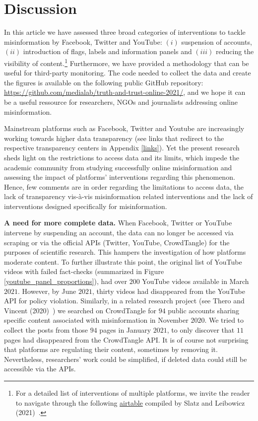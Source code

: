 \documentclass{article}
\begin{document}
\section{Discussion}

In this article we have assessed three broad categories of interventions to tackle misinformation by Facebook, Twitter and YouTube: $(i)$ suspension of accounts, $(ii)$ introduction of flags, labels and information panels and $(iii)$ reducing the visibility of content.\footnote{For a detailed list of interventions of multiple platforms, we invite the reader to navigate through the following \href{https://airtable.com/shrO0ooI9WSEfIUhb/tblAWQwFOiihKdQjm/viwZLAOzLK1NQ0c2n?blocks=hide}{airtable} compiled by Slatz and Leibowicz (2021)~\cite{niemanlab}.}
Furthermore, we have provided a methodology that can be useful for third-party monitoring. 
The code needed to collect the data and create the figures is available on the following public GitHub repository: \href{https://github.com/medialab/truth-and-trust-online-2021/}{https://github.com/medialab/truth-and-trust-online-2021/}, and we hope it can be a useful ressource for researchers, NGOs and journalists addressing online misinformation. 

\smallskip

Mainstream platforms such as Facebook, Twitter and Youtube are increasingly working towards higher data transparency (see links that redirect to the respective transparency centers in Appendix \ref{links}). 
Yet the present research sheds light on the restrictions to access data and its limits, which impede the academic community from studying successfully online misinformation and assessing the impact of platforms' interventions regarding this phenomenon. 
Hence, few comments are in order regarding the limitations to access data, the lack of transparency vis-\`{a}-vis misinformation related interventions and the lack of interventions designed specifically for misinformation. 

\smallskip

{\bf A need for more complete data.} 
When Facebook, Twitter or YouTube intervene by suspending an account, the data can no longer be accessed via scraping or via the official APIs (Twitter, YouTube, CrowdTangle) for the purposes of scientific research. 
This hampers the investigation of how platforms moderate content. 
To further illustrate this point, the original list of YouTube videos with failed fact-checks (summarized in Figure \ref{youtube_panel_proportions}), had over $200$ YouTube videos available in March $2021$. 
However, by June $2021$, thirty videos had disappeared from the YouTube API for policy violation. 
Similarly, in a related research project (see Thero and Vincent (2020)~\cite{therovincent}) we searched on CrowdTangle for $94$ public accounts sharing specific content associated with misinformation in November $2020$. 
We tried to collect the posts from those $94$ pages in January $2021$, to only discover that $11$ pages had disappeared from the CrowdTangle API.
It is of course not surprising that platforms are regulating their content, sometimes by removing it. 
Nevertheless, researchers' work could be simplified, if deleted data could still be accessible via the APIs.
\end{document}
